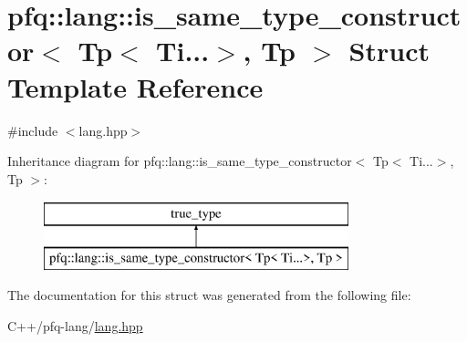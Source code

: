 \hypertarget{structpfq_1_1lang_1_1is__same__type__constructor_3_01Tp_3_01Ti_8_8_8_4_00_01Tp_01_4}{\section{pfq\+:\+:lang\+:\+:is\+\_\+same\+\_\+type\+\_\+constructor$<$ Tp$<$ Ti...$>$, Tp $>$ Struct Template Reference}
\label{structpfq_1_1lang_1_1is__same__type__constructor_3_01Tp_3_01Ti_8_8_8_4_00_01Tp_01_4}
}


{\ttfamily \#include $<$lang.\+hpp$>$}

Inheritance diagram for pfq\+:\+:lang\+:\+:is\+\_\+same\+\_\+type\+\_\+constructor$<$ Tp$<$ Ti...$>$, Tp $>$\+:\begin{figure}[H]
\begin{center}
\leavevmode
\includegraphics[height=2.000000cm]{structpfq_1_1lang_1_1is__same__type__constructor_3_01Tp_3_01Ti_8_8_8_4_00_01Tp_01_4}
\end{center}
\end{figure}


The documentation for this struct was generated from the following file\+:\begin{DoxyCompactItemize}
\item 
C++/pfq-\/lang/\hyperlink{lang_8hpp}{lang.\+hpp}\end{DoxyCompactItemize}
